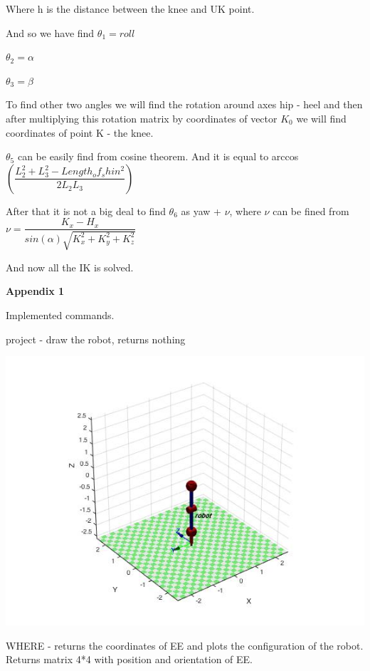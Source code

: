 \documentclass[12pt]{article}
\begin{document}
Where h is the distance between the knee and UK point.

And so we have find
$\theta_1 = roll$

$\theta_2 = \alpha$

$\theta_3 = \beta$

To find other two angles we will find the rotation around axes hip - heel and then after multiplying this rotation matrix by coordinates of vector $K_0$ we will find coordinates of point K - the knee. 

$\theta_5$ can be easily find from cosine theorem. And it is equal to arccos $\left(  \dfrac{L^2_2 + L^2_3 - Length_of_shin^2}{2 L_2 L_3} \right)$

After that it is not a big deal to find $\theta_6$ as yaw + $\nu$, where $\nu$ can be fined from $\nu = \dfrac{K_x - H_x}{sin(\alpha) \sqrt{K^2_x + K^2_y + K^2_z}}$

And now all the IK is solved.

\newpage

\begin{center}
\textbf{Appendix 1}
\end{center}

Implemented commands.

project - draw the robot, returns nothing

\begin{center}
  \includegraphics[width=15cm]{conf}
\end{center}

WHERE - returns the coordinates of EE and plots the configuration of the robot. Returns matrix 4*4 with position and orientation of EE.
\end{document}
